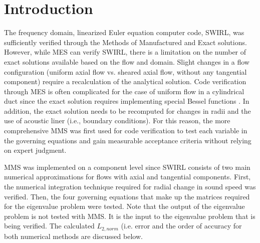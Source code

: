 \section{Introduction}
The frequency domain, linearized Euler equation computer code, SWIRL, was 
sufficiently verified through the Methods of Manufactured and Exact solutions. 
However, while MES can verify SWIRL, there is a limitation on the number of 
exact solutions available based on the flow and domain. Slight changes in a 
flow configuration (uniform axial flow vs. sheared axial flow, without any tangential 
component) require a recalculation of the analytical solution. Code verification 
through MES is often complicated for the case of uniform flow in a cylindrical 
duct since the exact solution requires implementing special Bessel functions
. In addition, the exact solution needs to be recomputed for changes in radii 
and the use of acoustic liner (i.e., boundary conditions). For this reason, 
the more comprehensive MMS was first used for code verification to test each 
variable in the governing equations and gain measurable acceptance criteria 
without relying on expert judgment.

MMS was implemented on a component level since SWIRL consists
of two main numerical approximations for flows with axial and tangential 
components. First, the numerical integration technique required for radial 
change in sound speed was verified. Then, the four governing equations that make
up the matrices required for the eigenvalue problem were tested. Note that the 
output of the eigenvalue problem is not tested with MMS. It is the input to the 
eigenvalue problem that is being verified. The calculated $L_{2,norm}$ (i.e.
error and the order of accuracy for both numerical methods are discussed below.

